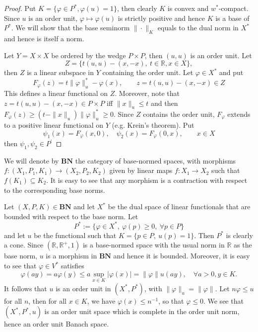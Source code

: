 \documentclass[12pt]{article}
\theoremstyle{remark}
\newcommand{\<}{\langle}
\newcommand{\ct}[1]{\mathbf{#1}}
\begin{document}
\begin{proof} Put $K=\{\varphi\in P^*, \varphi(u)=1\}$, then clearly $K$ is convex and $w^*$-compact. 
Since $u$ is an order unit, $\varphi\mapsto \varphi(u)$ is strictly positive and hence $K$ is a base of $P^*$. We will show that the base seminorm $\|\cdot\|_K$ equals to the dual norm in $X^*$ and hence is itself a norm.

Let $Y=X\times X$ be ordered by the wedge $P\times P$, then $(u,u)$ is an order unit. 
Let 
\[
Z=\{t(u,u)-(x,-x),\ t\in \mathbb R, x\in X\},
\]
then $Z$ is a linear subspace in $Y$ containing the order unit. 
Let  $\varphi\in X^*$ and  put 
\[
F_\varphi(z)=t\|\varphi\|_u^*-\varphi(x), \qquad z=t(u,u)-(x,-x)\in Z
\]
This defines a linear functional on $Z$. Moreover, note that $z=t(u,u)-(x,-x)\in P\times P$ iff $\|x\|_u\le t$ and then $F_\varphi(z)\ge (t-\|x\|_u)\|\varphi\|_u^*\ge 0$.
Since $Z$ contains the order unit, $F_\varphi$ extends to a positive linear functional on $Y$ (e.g. Krein's theorem). Put 
\[
\psi_1(x)=F_\varphi(x,0),\quad \psi_2(x)=F_\varphi(0,x),\qquad x\in X
\]
then $\psi_1,\psi_2\in P^'$


\end{proof}






We will denote 
by $\ct{BN}$ the category of base-normed spaces, with morphisms $f: (X_1,P_1,K_1)\to (X_2,P_2,K_2)$ given by linear maps $f:X_1\to X_2$ such that $f(K_1)\subseteq K_2$. It is easy to see that any morphism is a contraction with respect to the corresponding base norms.

Let $(X,P,K)\in \ct{BN}$ and let $X^*$ be the dual space of linear functionals that are bounded with respect to the base norm. Let 
\[
P^*:=\{ \varphi\in X^*,\ \varphi(p)\ge 0,\ \forall p\in P\}
\]
and let $u$ be the functional such that $K=\{p\in P,\ u(p)=1\}$. Then $P^*$ is clearly a  cone.
Since $(\mathbb R, \mathbb R^+, 1)$ is a base-normed space with the usual norm in $\mathbb R$ as the base norm, $u$ is a morphism in $\ct{BN}$ and hence it is bounded. Moreover, it is easy to see that  $\varphi\in V^*$ satisfies
\[
\varphi(ay)=a\varphi(y)\le a\sup_{x\in K}|\varphi(x)|=\|\varphi\|u(ay),\quad \forall  a>0, y\in K.
\]
It follows that $u$ is an order unit in $(X^*,P^*)$, with $\|\varphi\|_u=\|\varphi\|$. Let $n\varphi\le u$ for all $n$, then for all $x\in K$, we have $\varphi(x)\le n^{-1}$, so that $\varphi\le 0$. We see that $(X^*,P^*,u)$ is an order unit space which is complete in the order unit norm, hence an order unit Banach space.
\end{document}
